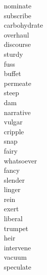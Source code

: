 \documentclass[a4paper, 11pt]{ctexart}
\begin{document}
\begin{multicols*}{3}
\begin{description}
\item[nominate]

\item[subscribe]

\item[carbohydrate]

\item[overhaul]

\item[discourse]

\item[sturdy]

\item[fuss]

\item[buffet]

\item[permeate]

\item[steep]

\item[dam]

\item[narrative]

\item[vulgar]

\item[cripple]

\item[snap]

\item[fairy]

\item[whatsoever]

\item[fancy]

\item[slender]

\item[linger]

\item[rein]

\item[exert]

\item[liberal]

\item[trumpet]

\item[heir]

\item[intervene]

\item[vacuum]

\item[speculate]


\end{description}
\end{multicols*}
\end{document}

